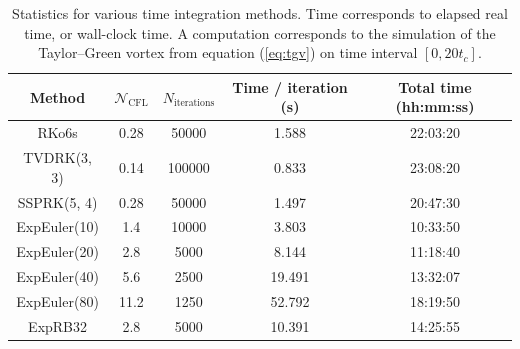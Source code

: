       \begin{figure}
        \centering
        \caption{}
        \label{fig:tgv_curves}
      \end{figure}

      \begin{table}
        \center
        \begin{tabular}{c|cccc}
          Method       & $\mathcal{N}_\textrm{CFL}$ & $N_\textrm{iterations}$ & Time / iteration (s) & Total time (hh:mm:ss) \\ \hline
          RKo6s        & 0.28                       & 50000                   & 1.588                & 22:03:20              \\
          TVDRK(3, 3)  & 0.14                       & 100000                  & 0.833                & 23:08:20              \\
          SSPRK(5, 4)  & 0.28                       & 50000                   & 1.497                & 20:47:30              \\ \hline
          ExpEuler(10) & 1.4                        & 10000                   & 3.803                & 10:33:50              \\
          ExpEuler(20) & 2.8                        & 5000                    & 8.144                & 11:18:40              \\
          ExpEuler(40) & 5.6                        & 2500                    & 19.491               & 13:32:07              \\
          ExpEuler(80) & 11.2                       & 1250                    & 52.792               & 18:19:50              \\
          ExpRB32      & 2.8                        & 5000                    & 10.391               & 14:25:55              \\
        \end{tabular}
        \caption{
          Statistics for various time integration methods.
          Time corresponds to elapsed real time, or wall-clock time.
          A computation corresponds to the simulation of the Taylor--Green vortex from equation (\ref{eq:tgv}) on time interval $\left[0, 20 t_c\right]$.}\label{tab:tgv}
      \end{table}

